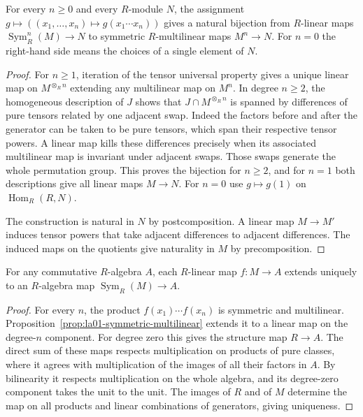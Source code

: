 \begin{proposition}
\label{prop:la01-symmetric-multilinear}
For every \(n\ge 0\) and every \(R\)-module \(N\), the assignment
\(g\mapsto ((x_1,\ldots,x_n)\mapsto g(x_1\cdots x_n))\) gives a natural
bijection from \(R\)-linear maps \(\operatorname{Sym}^n_R(M)\to N\)
to symmetric \(R\)-multilinear maps \(M^n\to N\). For \(n=0\) the
right-hand side means the choices of a single element of \(N\).
\end{proposition}
\begin{proof}
For \(n\ge 1\), iteration of the tensor universal property
gives a unique linear map on \(M^{\otimes_R n}\) extending any
multilinear map on \(M^n\). In degree \(n\ge 2\), the homogeneous
description of \(J\) shows that \(J\cap M^{\otimes_R n}\) is spanned
by differences of pure tensors related by one adjacent swap.
Indeed the factors before and after the generator can be taken
to be pure tensors, which span their respective tensor powers.
A linear map kills these differences precisely when its associated
multilinear map is invariant under adjacent swaps. Those swaps
generate the whole permutation group. This proves the bijection
for \(n\ge 2\), and for \(n=1\) both descriptions give all linear
maps \(M\to N\). For \(n=0\) use \(g\mapsto g(1)\) on
\(\operatorname{Hom}_R(R,N)\).

The construction is natural in \(N\) by postcomposition. A
linear map \(M\to M'\) induces tensor powers that take adjacent
differences to adjacent differences. The induced maps on the
quotients give naturality in \(M\) by precomposition.
\end{proof}

\begin{proposition}
\label{prop:la01-symmetric-free}
For any commutative \(R\)-algebra \(A\), each \(R\)-linear map
\(f\colon M\to A\) extends uniquely to an \(R\)-algebra map
\(\operatorname{Sym}_R(M)\to A\).
\end{proposition}
\begin{proof}
For every \(n\), the product \(f(x_1)\cdots f(x_n)\) is symmetric
and multilinear. Proposition~\ref{prop:la01-symmetric-multilinear}
extends it to a linear map on the degree-\(n\) component.
For degree zero this gives the structure map \(R\to A\).
The direct sum of these maps respects multiplication on products
of pure classes, where it agrees with multiplication of the images
of all their factors in \(A\). By bilinearity it respects
multiplication on the whole algebra, and its degree-zero component
takes the unit to the unit. The images of \(R\) and of \(M\)
determine the map on all products and linear combinations of
generators, giving uniqueness.
\end{proof}

